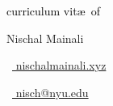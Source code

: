 \begin{scriptsize}
	 \textcolor{black}{curriculum vit\ae~of}
\end{scriptsize}

\vspace*{0.50em}
\begin{Huge} 
	Nischal Mainali
\end{Huge}

		  
\vspace*{0.25cm}

\begin{footnotesize}
	\begin{tiny}\faHome\end{tiny}~\href{http://nischalmainali.xyz}{
		nischalmainali.xyz
	}
	\quad \begin{tiny}\faEnvelope[regular]\end{tiny}~\href{mailto:me@mywebsite.com}{%
		nisch@nyu.edu
	} 
	

\end{footnotesize}